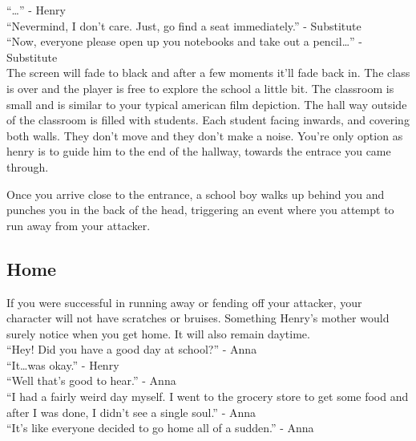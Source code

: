 \documentclass[12pt, a4paper]{article}
\begin{document}
            ``\ldots'' - Henry
            \\

            ``Nevermind, I don't care. Just, go find a seat immediately.'' - Substitute
            \\

            ``Now, everyone please open up you notebooks and take out a pencil\ldots'' - Substitute
            \\

            The screen will fade to black and after a few moments it'll fade back in. The class is over and the player is free to explore
            the school a little bit. The classroom is small and is similar to your typical american film depiction. The hall way outside of the classroom
            is filled with students. Each student facing inwards, and covering both walls. They don't move and they don't make a noise. You're only option
            as henry is to guide him to the end of the hallway, towards the entrace you came through.

            Once you arrive close to the entrance, a school boy walks up behind you and punches you in the back of the head, triggering an event where you attempt
            to run away from your attacker.

        \subsection{Home}

            If you were successful in running away or fending off your attacker, your character will not have scratches or bruises. Something Henry's mother would surely notice
            when you get home. It will also remain daytime.
            \\

            ``Hey! Did you have a good day at school?'' - Anna
            \\

            ``It\dots was okay.'' - Henry
            \\

            ``Well that's good to hear.'' - Anna
            \\

            ``I had a fairly weird day myself. I went to the grocery store to get some food and after I was done, I didn't see a single soul.'' - Anna
            \\

            ``It's like everyone decided to go home all of a sudden.'' - Anna
            \\
\end{document}
